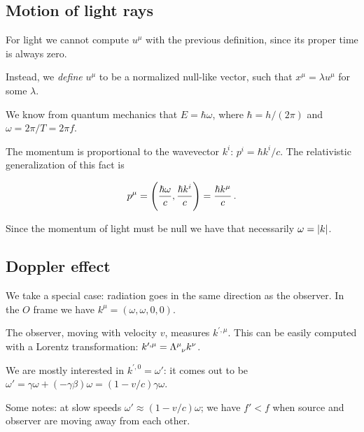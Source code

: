 \documentclass[main.tex]{subfiles}
\begin{document}
\subsection{Motion of light rays}

For light we cannot compute \(u^{\mu}\) with the previous definition, since its proper time is always zero.

Instead, we \emph{define} \(u^{\mu}\) to be a normalized null-like vector, such that \(x^{\mu} = \lambda u^{\mu}\) for some \(\lambda\).

We know from quantum mechanics that \(E = \hbar \omega\), where \(\hbar = h / (2 \pi)\) and \(\omega = 2 \pi / T = 2 \pi f\). 

The momentum is proportional to the wavevector \(k^{i}\): \(p^{i} = \hbar k^{i} / c\). The relativistic generalization of this fact is 

\begin{equation}
  p^{\mu} = \qty(\frac{\hbar \omega}{c}, \frac{\hbar k^{i}}{c}) = \frac{\hbar k^{\mu}}{c}\,.
\end{equation}

Since the momentum of light must be null we have that necessarily \(\omega = \abs{k} \).

\subsection{Doppler effect}

We take a special case: radiation goes in the same direction as the observer.
In the \(O\) frame we have \(k^{\mu} = (\omega, \omega,0,0)\).

The observer, moving with velocity \(v\), measures \(k^{\prime, \mu}\). This can be easily computed with a Lorentz transformation: \(k^{\prime, \mu} = \tensor{\Lambda}{^\mu_\nu} k^\nu\).

We are mostly interested in \(k^{\prime, 0} = \omega'\): it comes out to be \(\omega' = \gamma \omega + (- \gamma \beta)\omega = (1- v/c) \gamma \omega\).

Some notes: at slow speeds \(\omega' \approx (1-v/c) \omega\); we have \(f'<f\) when source and observer are moving away from each other. 
\end{document}
